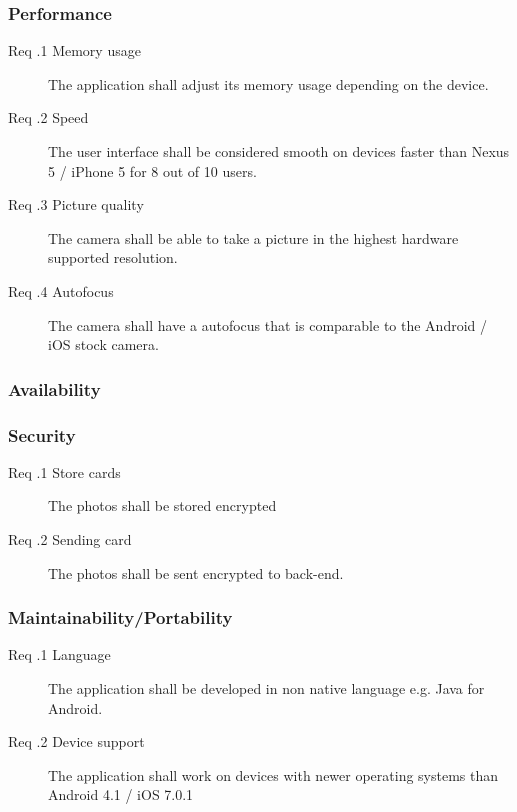 \subsubsection{Performance}
\begin{description}
	\item[Req \thesubsubsection.1 Memory usage] The application shall adjust its memory usage depending on the device.
	\item[Req \thesubsubsection.2 Speed] The user interface shall be considered smooth on devices faster than Nexus 5 / iPhone 5 for 8 out of 10 users. 
	\item[Req \thesubsubsection.3 Picture quality] The camera shall be able to take a picture in the highest hardware supported resolution. 
	\item[Req \thesubsubsection.4 Autofocus] The camera shall have a autofocus that is comparable to the Android / iOS stock camera. 
\end{description}
\subsubsection{Availability}
\subsubsection{Security}
\begin{description}
	\item[Req \thesubsubsection.1 Store cards] The photos shall be stored encrypted
	\item[Req \thesubsubsection.2 Sending card] The photos shall be sent encrypted to back-end.
\end{description}
\subsubsection{Maintainability/Portability}
\begin{description}
	\item[Req \thesubsubsection.1 Language] The application shall be developed in non native language e.g. Java for Android. 
	\item[Req \thesubsubsection.2 Device support] The application shall work on devices with newer operating systems than Android 4.1 / iOS 7.0.1
\end{description}

